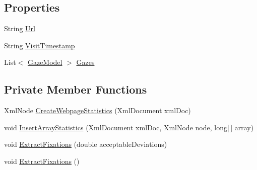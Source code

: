 \subsection*{Properties}
\begin{DoxyCompactItemize}
\item 
String \hyperlink{class_web_analyzer_1_1_models_1_1_data_model_1_1_webpage_model_a956b067ed12f422f646b7e2a4b6bb42d}{Url}
\item 
String \hyperlink{class_web_analyzer_1_1_models_1_1_data_model_1_1_webpage_model_ac3378fdc78273706547ec3a9d377ef9a}{Visit\+Timestamp}
\item 
List$<$ \hyperlink{class_web_analyzer_1_1_models_1_1_data_model_1_1_gaze_model}{Gaze\+Model} $>$ \hyperlink{class_web_analyzer_1_1_models_1_1_data_model_1_1_webpage_model_acb4a6ecac0e4ef9ed2df7b33e4694b31}{Gazes}
\end{DoxyCompactItemize}
\subsection*{Private Member Functions}
\begin{DoxyCompactItemize}
\item 
Xml\+Node \hyperlink{class_web_analyzer_1_1_models_1_1_data_model_1_1_webpage_model_af8b9bb060e28384f7ecf0635856187d4}{Create\+Webpage\+Statistics} (Xml\+Document xml\+Doc)
\item 
void \hyperlink{class_web_analyzer_1_1_models_1_1_data_model_1_1_webpage_model_a52e372578a17a8174ba376ca4d699b31}{Insert\+Array\+Statistics} (Xml\+Document xml\+Doc, Xml\+Node node, long\mbox{[}$\,$\mbox{]} array)
\item 
void \hyperlink{class_web_analyzer_1_1_models_1_1_data_model_1_1_webpage_model_a06a07e2bb00b5090294276c6f2057f6f}{Extract\+Fixations} (double acceptable\+Deviations)
\item 
void \hyperlink{class_web_analyzer_1_1_models_1_1_data_model_1_1_webpage_model_a6f50086cd1ed28c759322f0aae8d9700}{Extract\+Fixations} ()
\end{DoxyCompactItemize}
